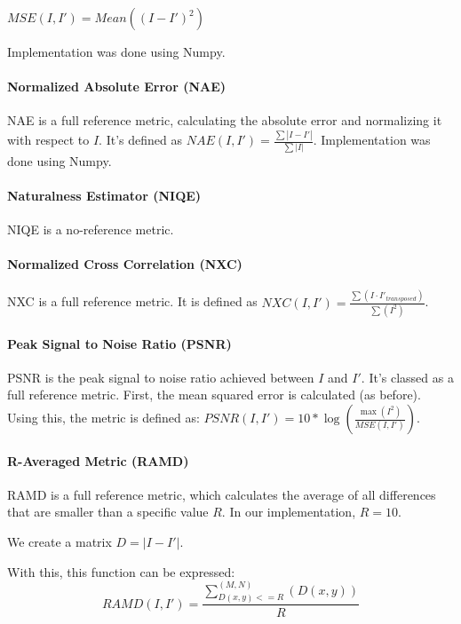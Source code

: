 \documentclass[10pt,a4paper]{article}
\begin{document}
                $MSE(I, I') = Mean((I - I')^ 2)$

                Implementation was done using Numpy.
            \paragraph{Normalized Absolute Error (NAE)}
                NAE is a full reference metric, calculating the absolute error and normalizing it with respect to $I$. It's defined as $NAE(I, I') = \frac{\sum |I - I'|}{\sum |I|}$. \cite{ImageQualityAssessmentTest}
                Implementation was done using Numpy.
            \paragraph{Naturalness Estimator (NIQE)}
                NIQE is a no-reference metric.

            \paragraph{Normalized Cross Correlation (NXC)}
                NXC is a full reference metric. It is defined as $NXC(I, I') = \frac{\sum (I \cdot I'_{transposed})}{\sum (I^2)}$. \cite{ImageQualityAssessmentTest}

            \paragraph{Peak Signal to Noise Ratio (PSNR)}
                PSNR is the peak signal to noise ratio achieved between $I$ and $I'$. It's classed as a full reference metric.
                First, the mean squared error is calculated (as before). Using this, the metric is defined as:
                $PSNR(I, I') = 10 * \log(\frac{\max(I^2)}{MSE(I, I')})$. \cite{ImageQualityAssessmentTest}

            \paragraph{R-Averaged Metric (RAMD)}
                RAMD is a full reference metric, which calculates the average of all differences that are smaller than a specific value $R$.
                In our implementation, $R=10$.

                We create a matrix $D = |I - I'|$.

                With this, this function can be expressed: $$RAMD(I, I') = \frac{\sum_{D(x, y) <= R}^{(M, N)}(D(x, y))}{R}$$
\end{document}
